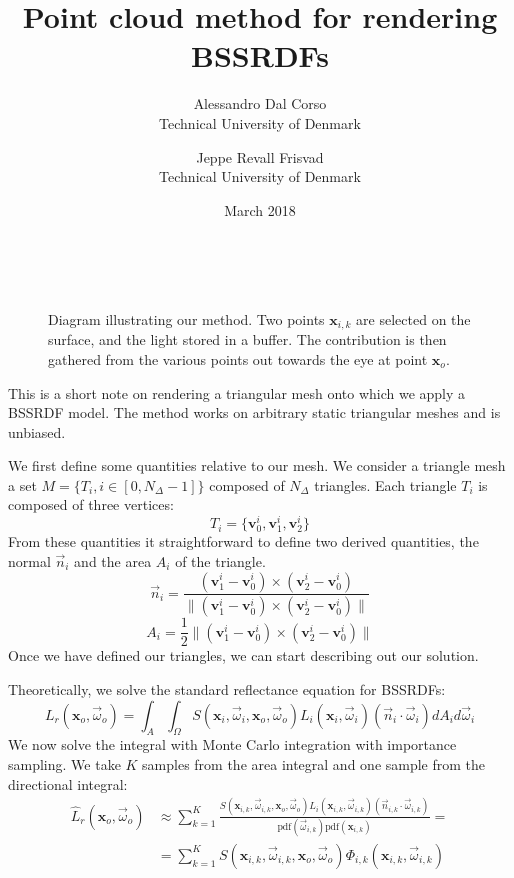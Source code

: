\documentclass[10pt,a4paper]{article}
\title{Point cloud method for rendering BSSRDFs}
\date{March 2018}
\author{ Alessandro Dal Corso \\ Technical University of Denmark \and Jeppe Revall Frisvad \\ Technical University of Denmark
}
\begin{document}
\maketitle

\begin{figure}
\centering
   \def\svgwidth{0.8\textwidth}
    \\
\caption{Diagram illustrating our method. Two points $\mathbf{x}_{i,k}$ are selected on the surface, and the light stored in a buffer. The contribution is then gathered from the various points out towards the eye at point $\mathbf{x}_o$.} 
\label{fig:vpt}
\end{figure}

This is a short note on rendering a triangular mesh onto which we apply a BSSRDF model. The method works on arbitrary static triangular meshes and is unbiased.

We first define some quantities relative to our mesh. We consider a triangle mesh a set $M = \{T_i, i \in [0, N_\Delta - 1] \}$ composed of $N_{\Delta}$ triangles. Each triangle $T_i$ is composed of three vertices:
\begin{equation*}
T_i = \{ \mathbf{v}^i_0, \mathbf{v}^i_1, \mathbf{v}^i_2 \}
\end{equation*}
From these quantities it straightforward to define two derived quantities, the normal $\vec{n}_i$ and the area $A_i$ of the triangle. 
\begin{equation*}
\vec{n}_i = \frac{(\mathbf{v}^i_1 - \mathbf{v}^i_0) \times (\mathbf{v}^i_2 - \mathbf{v}^i_0) }{ \|(\mathbf{v}^i_1 - \mathbf{v}^i_0) \times (\mathbf{v}^i_2 - \mathbf{v}^i_0)  \|}
\end{equation*}
\begin{equation*}
A_i = \frac{1}{2} \|(\mathbf{v}^i_1 - \mathbf{v}^i_0) \times (\mathbf{v}^i_2 - \mathbf{v}^i_0) \|
\end{equation*}
Once we have defined our triangles, we can start describing out our solution. 

Theoretically, we solve the standard reflectance equation for BSSRDFs:
\begin{equation*}
L_r(\mathbf{x}_o, \vec{\omega}_o) = \int_A \int_\Omega S(\mathbf{x}_i, \vec{\omega}_i, \mathbf{x}_o, \vec{\omega}_o) L_i(\mathbf{x}_i, \vec{\omega}_i) (\vec{n}_i \cdot \vec{\omega}_i) d A_i d \vec{\omega}_i 
\end{equation*}
We now solve the integral with Monte Carlo integration with importance sampling. We take $K$ samples from the area integral and one sample from the directional integral:
\begin{equation}
\label{eq:mc}
\begin{split}
\hat{L}_r(\mathbf{x}_o, \vec{\omega}_o) &\approx \sum_{k = 1}^K \frac{S(\mathbf{x}_{i,k}, \vec{\omega}_{i,k}, \mathbf{x}_o, \vec{\omega}_o) L_i(\mathbf{x}_{i,k}, \vec{\omega}_{i,k}) (\vec{n}_{i,k}\cdot \vec{\omega}_{i,k})}{\text{pdf}(\vec{\omega}_{i,k}) \text{pdf}(\mathbf{x}_{i,k})} = \\
&=  \sum_{k = 1}^K S(\mathbf{x}_{i,k}, \vec{\omega}_{i,k}, \mathbf{x}_o, \vec{\omega}_o) \Phi_{i,k}(\mathbf{x}_{i,k}, \vec{\omega}_{i,k})
\end{split}
\end{equation}
\end{document}
